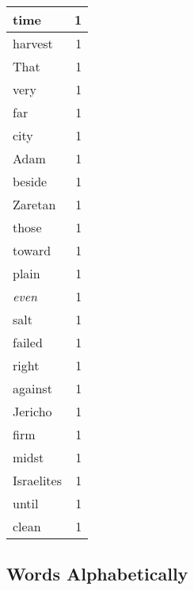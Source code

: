 \begin{center}
\begin{longtable}{l|r}
time & 1 \\ \hline
harvest & 1 \\ \hline
That & 1 \\ \hline
very & 1 \\ \hline
far & 1 \\ \hline
city & 1 \\ \hline
Adam & 1 \\ \hline
beside & 1 \\ \hline
Zaretan & 1 \\ \hline
those & 1 \\ \hline
toward & 1 \\ \hline
plain & 1 \\ \hline
\emph{even} & 1 \\ \hline
salt & 1 \\ \hline
failed & 1 \\ \hline
right & 1 \\ \hline
against & 1 \\ \hline
Jericho & 1 \\ \hline
firm & 1 \\ \hline
midst & 1 \\ \hline
Israelites & 1 \\ \hline
until & 1 \\ \hline
clean & 1 \\ \hline
\end{longtable}
\end{center}



\normalsize



\subsection{Words Alphabetically}

